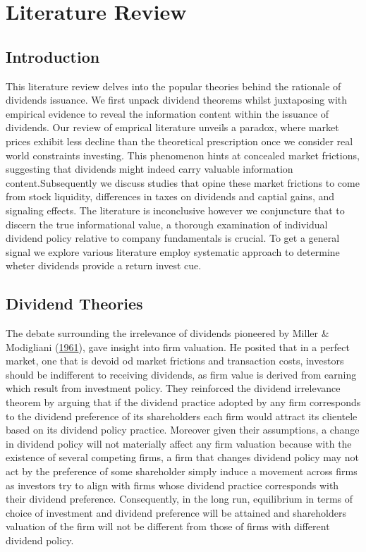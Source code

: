 \documentclass[11pt,preprint, authoryear]{elsarticle}
\numberwithin{equation}{section}
\numberwithin{figure}{section}
\numberwithin{table}{section}
\begin{document}
\hypertarget{literature-review}{%
\section{Literature Review}\label{literature-review}}

\hypertarget{introduction-1}{%
\subsection{Introduction}\label{introduction-1}}

This literature review delves into the popular theories behind the
rationale of dividends issuance. We first unpack dividend theorems
whilst juxtaposing with empirical evidence to reveal the information
content within the issuance of dividends. Our review of emprical
literature unveils a paradox, where market prices exhibit less decline
than the theoretical prescription once we consider real world
constraints investing. This phenomenon hints at concealed market
frictions, suggesting that dividends might indeed carry valuable
information content.Subsequently we discuss studies that opine these
market frictions to come from stock liquidity, differences in taxes on
dividends and captial gains, and signaling effects. The literature is
inconclusive however we conjuncture that to discern the true
informational value, a thorough examination of individual dividend
policy relative to company fundamentals is crucial. To get a general
signal we explore various literature employ systematic approach to
determine wheter dividends provide a return invest cue.

\hypertarget{dividend-theories}{%
\subsection{\texorpdfstring{Dividend Theories
\label{theory}}{Dividend Theories }}\label{dividend-theories}}

The debate surrounding the irrelevance of dividends pioneered by Miller
\& Modigliani (\protect\hyperlink{ref-miller}{1961}), gave insight into
firm valuation. He posited that in a perfect market, one that is devoid
od market frictions and transaction costs, investors should be
indifferent to receiving dividends, as firm value is derived from
earning which result from investment policy. They reinforced the
dividend irrelevance theorem by arguing that if the dividend practice
adopted by any firm corresponds to the dividend preference of its
shareholders each firm would attract its clientele based on its dividend
policy practice. Moreover given their assumptions, a change in dividend
policy will not materially affect any firm valuation because with the
existence of several competing firms, a firm that changes dividend
policy may not act by the preference of some shareholder simply induce a
movement across firms as investors try to align with firms whose
dividend practice corresponds with their dividend preference.
Consequently, in the long run, equilibrium in terms of choice of
investment and dividend preference will be attained and shareholders
valuation of the firm will not be different from those of firms with
different dividend policy.
\end{document}

